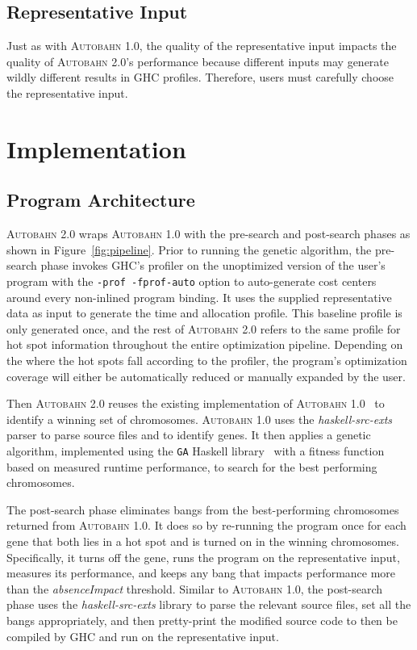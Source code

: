 \documentclass[format=sigplan, review=true, 9pt]{acmart}
\newcommand{\figref}[1]{Figure~\ref{#1}}
\newcommand{\hotspot}[0]{hot spot}
\newcommand{\hotspots}[0]{hot spots}
\newcommand{\Ao}[0]{\textsc{Autobahn 1.0}}
\newcommand{\At}[0]{\textsc{Autobahn 2.0}}
\newcommand{\preopt}[0]{pre-search}
\newcommand{\postopt}[0]{post-search}
\newcommand{\absim}[0]{\textit{absenceImpact}}
\begin{document}
\subsection{Representative Input}
Just as with \Ao{}, the quality of the representative input impacts the quality of
\At{}'s performance because different inputs may
generate wildly different results in GHC profiles. Therefore, users
must carefully choose the representative input.


\section{Implementation}

\subsection{Program Architecture}
\At{} wraps \Ao{} with the  \preopt{} and \postopt{} phases as shown
in \figref{fig:pipeline}.  
Prior to running the genetic algorithm, the \preopt{} phase invokes
GHC's profiler on the unoptimized version of the user's program with
the \texttt{-prof -fprof-auto} option to auto-generate cost centers
around every non-inlined program binding.  It uses the supplied
representative data as input to generate the time and
allocation profile.  This baseline profile is only generated once, and
the rest of \At{} refers to the same profile for \hotspot{}
information throughout the entire optimization pipeline.
Depending on the where the \hotspots{} fall according to the profiler, 
the program's optimization coverage will either be
automatically reduced or manually expanded by the user.

Then \At{} reuses the existing implementation
of \Ao{}~\cite{autobahn-wang} to identify a winning set of 
chromosomes.
\Ao{} uses the \textit{haskell-src-exts}~\cite{langexts} parser to parse
source files and to identify genes.  
It then applies a genetic algorithm,
implemented using the \texttt{GA} Haskell library~\cite{genetic}
with a fitness function based on measured runtime performance, to search for the best performing chromosomes.

The \postopt{} phase eliminates bangs from the best-performing
chromosomes returned from \Ao{}.  It does so by re-running the program
once for each gene that both lies in a \hotspot{} and is turned on in
the winning chromosomes.  Specifically, it turns off the gene, runs
the program on the representative input, measures its performance, and
keeps any bang that impacts performance more than the \absim{}
threshold.  Similar to \Ao{}, the \postopt{} phase uses
the \textit{haskell-src-exts} library to parse the relevant source
files, set all the bangs appropriately, and then pretty-print the
modified source code to then be compiled by GHC and run on the
representative input. 
\end{document}
